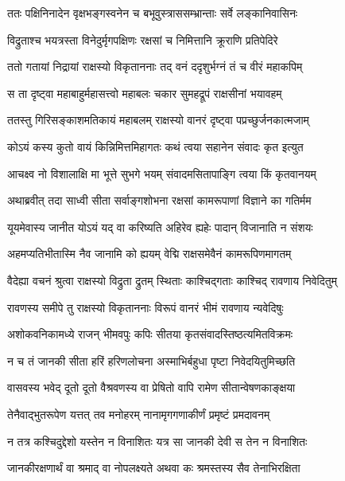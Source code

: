 
\twolineshloka
{ततः पक्षिनिनादेन वृक्षभङ्गस्वनेन च}
{बभूवुस्त्राससम्भ्रान्ताः सर्वे लङ्कानिवासिनः} %

\twolineshloka
{विद्रुताश्च भयत्रस्ता विनेदुर्मृगपक्षिणः}
{रक्षसां च निमित्तानि क्रूराणि प्रतिपेदिरे} %

\twolineshloka
{ततो गतायां निद्रायां राक्षस्यो विकृताननाः}
{तद् वनं ददृशुर्भग्नं तं च वीरं महाकपिम्} %

\twolineshloka
{स ता दृष्ट्वा महाबाहुर्महासत्त्वो महाबलः}
{चकार सुमहद्रूपं राक्षसीनां भयावहम्} %

\twolineshloka
{ततस्तु गिरिसङ्काशमतिकायं महाबलम्}
{राक्षस्यो वानरं दृष्ट्वा पप्रच्छुर्जनकात्मजाम्} %

\twolineshloka
{कोऽयं कस्य कुतो वायं किन्निमित्तमिहागतः}
{कथं त्वया सहानेन संवादः कृत इत्युत} %

\twolineshloka
{आचक्ष्व नो विशालाक्षि मा भूत्ते सुभगे भयम्}
{संवादमसितापाङ्गि त्वया किं कृतवानयम्} %

\twolineshloka
{अथाब्रवीत् तदा साध्वी सीता सर्वाङ्गशोभना}
{रक्षसां कामरूपाणां विज्ञाने का गतिर्मम} %

\twolineshloka
{यूयमेवास्य जानीत योऽयं यद् वा करिष्यति}
{अहिरेव ह्यहेः पादान् विजानाति न संशयः} %

\twolineshloka
{अहमप्यतिभीतास्मि नैव जानामि को ह्ययम्}
{वेद्मि राक्षसमेवैनं कामरूपिणमागतम्} %

\twolineshloka
{वैदेह्या वचनं श्रुत्वा राक्षस्यो विद्रुता द्रुतम्}
{स्थिताः काश्चिद्गताः काश्चिद् रावणाय निवेदितुम्} %

\twolineshloka
{रावणस्य समीपे तु राक्षस्यो विकृताननाः}
{विरूपं वानरं भीमं रावणाय न्यवेदिषुः} %

\twolineshloka
{अशोकवनिकामध्ये राजन् भीमवपुः कपिः}
{सीतया कृतसंवादस्तिष्ठत्यमितविक्रमः} %

\twolineshloka
{न च तं जानकी सीता हरिं हरिणलोचना}
{अस्माभिर्बहुधा पृष्टा निवेदयितुमिच्छति} %

\twolineshloka
{वासवस्य भवेद् दूतो दूतो वैश्रवणस्य वा}
{प्रेषितो वापि रामेण सीतान्वेषणकाङ्क्षया} %

\twolineshloka
{तेनैवाद्भुतरूपेण यत्तत् तव मनोहरम्}
{नानामृगगणाकीर्णं प्रमृष्टं प्रमदावनम्} %

\twolineshloka
{न तत्र कश्चिदुद्देशो यस्तेन न विनाशितः}
{यत्र सा जानकी देवी स तेन न विनाशितः} %

\twolineshloka
{जानकीरक्षणार्थं वा श्रमाद् वा नोपलक्ष्यते}
{अथवा कः श्रमस्तस्य सैव तेनाभिरक्षिता} %

